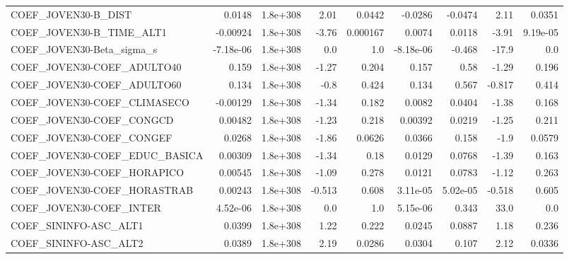 \begin{tabular}{lrrrrrrrr}
COEF\_JOVEN30-B\_DIST               &      0.0148 &     1.8e+308 &    2.01 &   0.0442 &    -0.0286 &     -0.0474 &         2.11 &        0.0351 \\
COEF\_JOVEN30-B\_TIME\_ALT1          &    -0.00924 &     1.8e+308 &   -3.76 & 0.000167 &     0.0074 &      0.0118 &        -3.91 &      9.19e-05 \\
COEF\_JOVEN30-Beta\_sigma\_s         &   -7.18e-06 &     1.8e+308 &     0.0 &      1.0 &  -8.18e-06 &      -0.468 &        -17.9 &           0.0 \\
COEF\_JOVEN30-COEF\_ADULTO40        &       0.159 &     1.8e+308 &   -1.27 &    0.204 &      0.157 &        0.58 &        -1.29 &         0.196 \\
COEF\_JOVEN30-COEF\_ADULTO60        &       0.134 &     1.8e+308 &    -0.8 &    0.424 &      0.134 &       0.567 &       -0.817 &         0.414 \\
COEF\_JOVEN30-COEF\_CLIMASECO       &    -0.00129 &     1.8e+308 &   -1.34 &    0.182 &     0.0082 &      0.0404 &        -1.38 &         0.168 \\
COEF\_JOVEN30-COEF\_CONGCD          &     0.00482 &     1.8e+308 &   -1.23 &    0.218 &    0.00392 &      0.0219 &        -1.25 &         0.211 \\
COEF\_JOVEN30-COEF\_CONGEF          &      0.0268 &     1.8e+308 &   -1.86 &   0.0626 &     0.0366 &       0.158 &         -1.9 &        0.0579 \\
COEF\_JOVEN30-COEF\_EDUC\_BASICA     &     0.00309 &     1.8e+308 &   -1.34 &     0.18 &     0.0129 &      0.0768 &        -1.39 &         0.163 \\
COEF\_JOVEN30-COEF\_HORAPICO        &     0.00545 &     1.8e+308 &   -1.09 &    0.278 &     0.0121 &      0.0783 &        -1.12 &         0.263 \\
COEF\_JOVEN30-COEF\_HORASTRAB       &     0.00243 &     1.8e+308 &  -0.513 &    0.608 &   3.11e-05 &    5.02e-05 &       -0.518 &         0.605 \\
COEF\_JOVEN30-COEF\_INTER           &    4.52e-06 &     1.8e+308 &     0.0 &      1.0 &   5.15e-06 &       0.343 &         33.0 &           0.0 \\
COEF\_SININFO-ASC\_ALT1             &      0.0399 &     1.8e+308 &    1.22 &    0.222 &     0.0245 &      0.0887 &         1.18 &         0.236 \\
COEF\_SININFO-ASC\_ALT2             &      0.0389 &     1.8e+308 &    2.19 &   0.0286 &     0.0304 &       0.107 &         2.12 &        0.0336 \\

\end{tabular}
